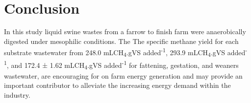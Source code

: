 \section{Conclusion}
In this study liquid swine wastes from a farrow to finish farm were anaerobically digested under mesophilic conditions. The The specific methane yield for each substrate wastewater  from 248.0 mLCH\textsubscript{4}.gVS added\textsuperscript{-1}, 293.9 mLCH\textsubscript{4}.gVS added\textsuperscript{-1}, and 172.4 ± 1.62 mLCH\textsubscript{4}.gVS added\textsuperscript{-1} for fattening, gestation, and weaners wastewater, are encouraging for on farm energy generation and may provide an important contributor to alleviate the increasing energy demand within the industry.